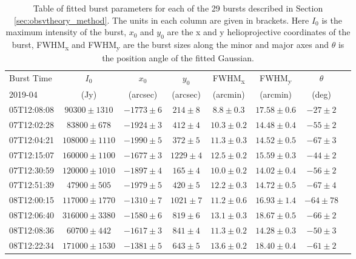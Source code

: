 \begin{table}
\centering
\caption[Table of fitted burst parameters]{Table of fitted burst parameters for each of the 29 bursts described in Section \ref{sec:obsvtheory_method}. The units in each column are given in brackets. Here $I_0$ is the maximum intensity of the burst, $x_0$ and $y_0$ are the x and y helioprojective coordinates of the burst, FWHM\textsubscript{x} and FWHM\textsubscript{y} are the burst sizes along the minor and major axes and $\theta$ is the position angle of the fitted Gaussian.}
\label{tab:dataset}
\begin{tabular}{lcccccc p{\columnwidth}}
\toprule
Burst Time & $I_0$  & $x_0$ & $y_0$  & FWHM\textsubscript{x} & FWHM\textsubscript{y} & $\theta$ \\
 2019-04 & (Jy) & (arcsec) & (arcsec) & (arcmin) & (arcmin) &  (deg) \\
\midrule
05T12:08:08 &  $ 90300 \pm 1310$ & $-1773 \pm 6$  & $  214 \pm 8$  &  $  8.8 \pm 0.3$ &  $ 17.58 \pm 0.6$ & $ -27 \pm 2$ \\
07T12:02:28 &  $ 83800 \pm  678$ & $-1924 \pm 3$  & $  412 \pm 4$  &  $ 10.3 \pm 0.2$ &  $ 14.48 \pm 0.4$ & $ -55 \pm 2$ \\
07T12:04:21 &  $108000 \pm 1110$ & $-1990 \pm 5$  & $  372 \pm 5$  &  $ 11.3 \pm 0.3$ &  $ 14.52 \pm 0.5$ & $ -67 \pm 3$ \\
07T12:15:07 &  $160000 \pm 1100$ & $-1677 \pm 3$  & $ 1229 \pm 4$  &  $ 12.5 \pm 0.2$ &  $ 15.59 \pm 0.3$ & $ -44 \pm 2$ \\
07T12:30:59 &  $120000 \pm 1010$ & $-1897 \pm 4$  & $  165 \pm 4$  &  $ 10.0 \pm 0.2$ &  $ 14.02 \pm 0.4$ & $ -56 \pm 2$ \\
07T12:51:39 &  $ 47900 \pm  505$ & $-1979 \pm 5$  & $  420 \pm 5$  &  $ 12.2 \pm 0.3$ &  $ 14.72 \pm 0.5$ & $ -67 \pm 4$ \\
08T12:00:15 &  $117000 \pm 1770$ & $-1310 \pm 7$  & $ 1021 \pm 7$  &  $ 11.2 \pm 0.6$ &  $ 16.93 \pm 1.4$ & $ -64 \pm 78$ \\
08T12:06:40 &  $316000 \pm 3380$ & $-1580 \pm 6$  & $  819 \pm 6$  &  $ 13.1 \pm 0.3$ &  $ 18.67 \pm 0.5$ & $ -66 \pm 2$ \\
08T12:08:36 &  $ 60700 \pm  442$ & $-1617 \pm 3$  & $  841 \pm 4$  &  $ 11.3 \pm 0.2$ &  $ 14.28 \pm 0.3$ & $ -50 \pm 3$ \\
08T12:22:34 &  $171000 \pm 1530$ & $-1381 \pm 5$  & $  643 \pm 5$  &  $ 13.6 \pm 0.2$ &  $ 18.40 \pm 0.4$ & $ -61 \pm 2$ \\

\end{tabular}
\end{table}
